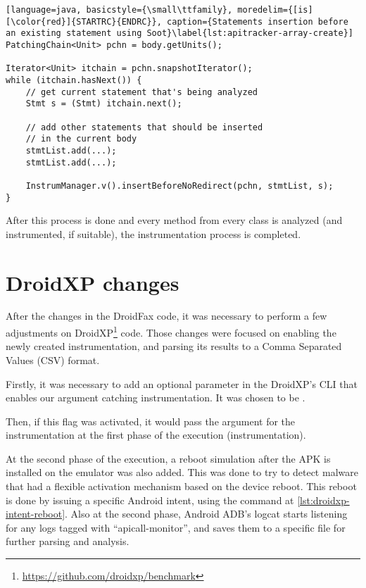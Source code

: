 \begin{lstlisting}[language=java, basicstyle={\small\ttfamily}, moredelim={[is][\color{red}]{STARTRC}{ENDRC}}, caption={Statements insertion before an existing statement using Soot}\label{lst:apitracker-array-create}]
PatchingChain<Unit> pchn = body.getUnits();
				
Iterator<Unit> itchain = pchn.snapshotIterator();    
while (itchain.hasNext()) {
    // get current statement that's being analyzed
    Stmt s = (Stmt) itchain.next();

    // add other statements that should be inserted
    // in the current body
    stmtList.add(...);
    stmtList.add(...);
    
    InstrumManager.v().insertBeforeNoRedirect(pchn, stmtList, s);
}
\end{lstlisting}



After this process is done and every method from every class is analyzed (and instrumented, if suitable), the instrumentation process is completed.

\section{DroidXP changes}

After the changes in the DroidFax code, it was necessary to perform a few adjustments on DroidXP\footnote{\url{https://github.com/droidxp/benchmark}} code. Those changes were focused on enabling the newly created instrumentation, and parsing its results to a Comma Separated Values (CSV) format.

Firstly, it was necessary to add an optional parameter in the DroidXP's CLI that enables our argument catching instrumentation. It was chosen to be .

Then, if this flag was activated, it would pass the  argument for the instrumentation at the first phase of the execution (instrumentation). 

At the second phase of the execution, a reboot simulation after the APK is installed on the emulator was also added. This was done to try to detect malware that had a flexible activation mechanism based on the device reboot. This reboot is done by issuing a specific Android intent, using the command at \ref{lst:droidxp-intent-reboot}. Also at the second phase, Android ADB's logcat\cite{noauthor_logcat_2023} starts listening for any logs tagged with ``apicall-monitor'', and saves them to a specific file for further parsing and analysis.


